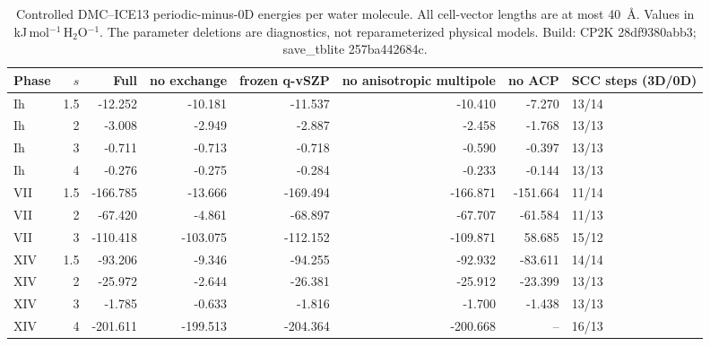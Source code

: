 \begin{table}
\caption{Controlled DMC--ICE13 periodic-minus-0D energies per water molecule. All cell-vector lengths are at most 40~\AA. Values in kJ\,mol$^{-1}$\,H$_2$O$^{-1}$. The parameter deletions are diagnostics, not reparameterized physical models. Build: CP2K 28df9380abb3; save\_tblite 257ba442684c.}
\begin{tabular}{lrrrrrrl}
\hline\hline
Phase & $s$ & Full & no exchange & frozen q-vSZP & no anisotropic multipole & no ACP & SCC steps (3D/0D) \\
\hline
Ih & 1.5 & -12.252 & -10.181 & -11.537 & -10.410 & -7.270 & 13/14 \\
Ih & 2 & -3.008 & -2.949 & -2.887 & -2.458 & -1.768 & 13/13 \\
Ih & 3 & -0.711 & -0.713 & -0.718 & -0.590 & -0.397 & 13/13 \\
Ih & 4 & -0.276 & -0.275 & -0.284 & -0.233 & -0.144 & 13/13 \\
VII & 1.5 & -166.785 & -13.666 & -169.494 & -166.871 & -151.664 & 11/14 \\
VII & 2 & -67.420 & -4.861 & -68.897 & -67.707 & -61.584 & 11/13 \\
VII & 3 & -110.418 & -103.075 & -112.152 & -109.871 & 58.685 & 15/12 \\
XIV & 1.5 & -93.206 & -9.346 & -94.255 & -92.932 & -83.611 & 14/14 \\
XIV & 2 & -25.972 & -2.644 & -26.381 & -25.912 & -23.399 & 13/13 \\
XIV & 3 & -1.785 & -0.633 & -1.816 & -1.700 & -1.438 & 13/13 \\
XIV & 4 & -201.611 & -199.513 & -204.364 & -200.668 & -- & 16/13 \\
\hline\hline
\end{tabular}
\end{table}
